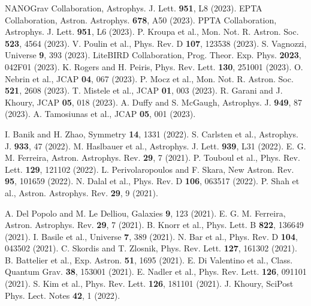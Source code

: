 \documentclass[aps,prd,twocolumn,showpacs,superscriptaddress,groupedaddress,nofootinbib]{revtex4-2}
\begin{document}

\begin{thebibliography}{99}

 NANOGrav Collaboration, Astrophys. J. Lett. \textbf{951}, L8 (2023).
 EPTA Collaboration, Astron. Astrophys. \textbf{678}, A50 (2023).
 PPTA Collaboration, Astrophys. J. Lett. \textbf{951}, L6 (2023).
 P. Kroupa et al., Mon. Not. R. Astron. Soc. \textbf{523}, 4564 (2023).
 V. Poulin et al., Phys. Rev. D \textbf{107}, 123538 (2023).
 S. Vagnozzi, Universe \textbf{9}, 393 (2023).
 LiteBIRD Collaboration, Prog. Theor. Exp. Phys. \textbf{2023}, 042F01 (2023).
 K. Rogers and H. Peiris, Phys. Rev. Lett. \textbf{130}, 251001 (2023).
 O. Nebrin et al., JCAP \textbf{04}, 067 (2023).
 P. Mocz et al., Mon. Not. R. Astron. Soc. \textbf{521}, 2608 (2023).
 T. Mistele et al., JCAP \textbf{01}, 003 (2023).
 R. Garani and J. Khoury, JCAP \textbf{05}, 018 (2023).
 A. Duffy and S. McGaugh, Astrophys. J. \textbf{949}, 87 (2023).
 A. Tamosiunas et al., JCAP \textbf{05}, 001 (2023).

 I. Banik and H. Zhao, Symmetry \textbf{14}, 1331 (2022).
 S. Carlsten et al., Astrophys. J. \textbf{933}, 47 (2022).
 M. Haslbauer et al., Astrophys. J. Lett. \textbf{939}, L31 (2022).
 E. G. M. Ferreira, Astron. Astrophys. Rev. \textbf{29}, 7 (2021).
 P. Touboul et al., Phys. Rev. Lett. \textbf{129}, 121102 (2022).
 L. Perivolaropoulos and F. Skara, New Astron. Rev. \textbf{95}, 101659 (2022).
 N. Dalal et al., Phys. Rev. D \textbf{106}, 063517 (2022).
 P. Shah et al., Astron. Astrophys. Rev. \textbf{29}, 9 (2021).

 A. Del Popolo and M. Le Delliou, Galaxies \textbf{9}, 123 (2021).
 E. G. M. Ferreira, Astron. Astrophys. Rev. \textbf{29}, 7 (2021).
 B. Knorr et al., Phys. Lett. B \textbf{822}, 136649 (2021).
 I. Basile et al., Universe \textbf{7}, 389 (2021).
 N. Bar et al., Phys. Rev. D \textbf{104}, 043502 (2021).
 C. Skordis and T. Zlosnik, Phys. Rev. Lett. \textbf{127}, 161302 (2021).
 B. Battelier et al., Exp. Astron. \textbf{51}, 1695 (2021).
 E. Di Valentino et al., Class. Quantum Grav. \textbf{38}, 153001 (2021).
 E. Nadler et al., Phys. Rev. Lett. \textbf{126}, 091101 (2021).
 S. Kim et al., Phys. Rev. Lett. \textbf{126}, 181101 (2021).
 J. Khoury, SciPost Phys. Lect. Notes \textbf{42}, 1 (2022).


\end{thebibliography}
\end{document}
